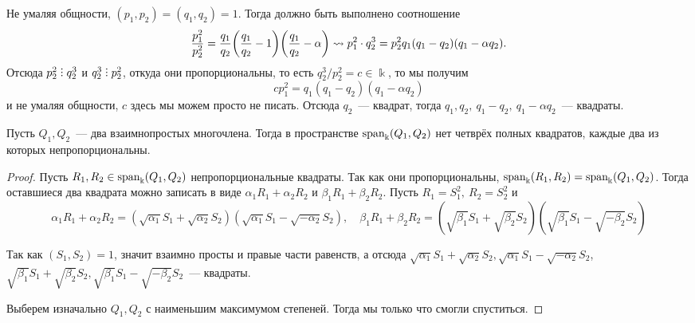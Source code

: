 	 Не умаляя общности, $(p_1, p_2) = (q_1, q_2) = 1$. Тогда должно быть выполнено соотношение 
	 \[
	 	\frac{p_1^2}{p_2^2} = \frac{q_1}{q_2}\lr*{\frac{q_1}{q_2} - 1}\lr*{\frac{q_1}{q_2} - \alpha} \rightsquigarrow p_1^2 \cdot q_2^3 = p_2^2 q_1(q_1 - q_2)(q_1 - \alpha q_2). 
	 \]
	 Отсюда $p_2^2 \divby q_2^3$  и $q_2^3 \divby p_2^2$, откуда они пропорциональны, то есть $q_2^3 / p_2^2 = c \in \Bbbk$, то мы получим 
	 \[
	 	c p_1^2 = q_1(q_1 - q_2)(q_1 - \alpha q_2)
	 \]
	 и не умаляя общности, $c$ здесь мы можем просто не писать. Отсюда $q_2$~--- квадрат, тогда $  q_1, q_2, \ q_1 - q_2, \ q_1 - \alpha q_2$~--- квадраты. 

	 \begin{statement} 
	 	Пусть $Q_1, Q_2$~--- два взаимнопростых многочлена. Тогда в пространстве $\operatorname{span}_{\Bbbk}(Q_1, Q_2)$ нет четврёх полных квадратов, каждые два из которых непропорциональны. 
	 \end{statement}
	 \begin{proof}
	 	Пусть $R_1, R_2 \in \operatorname{span}_{\Bbbk}(Q_1, Q_2)$ непропорциональные квадраты. Так как они пропорциональны, $\operatorname{span}_{\Bbbk}(R_1, R_2) = \operatorname{span}_{\Bbbk}(Q_1, Q_2)$. Тогда оставшиеся два квадрата можно записать в виде $\alpha_1 R_1 + \alpha_2 R_2$ и $\beta_1 R_1 + \beta_2 R_2$. Пусть $R_1 = S_1^2, \ R_2 = S_2^2$ и  
	 	\[
	 		\alpha_1 R_1 + \alpha_2 R_2 = (\sqrt{\alpha_1} S_1 + \sqrt{\alpha_2}S_2)(\sqrt{\alpha_1} S_1 - \sqrt{-\alpha_2}S_2), \quad \beta_1 R_1 + \beta_2 R_2 = (\sqrt{\beta_1} S_1 + \sqrt{\beta_2}S_2)(\sqrt{\beta_1} S_1 - \sqrt{-\beta_2}S_2)
	 	\]

	 	Так как $(S_1, S_2) = 1$, значит взаимно просты и правые части равенств, а отсюда $\sqrt{\alpha_1} S_1 + \sqrt{\alpha_2}S_2, \sqrt{\alpha_1} S_1 - \sqrt{-\alpha_2}S_2$, $\sqrt{\beta_1} S_1 + \sqrt{\beta_2}S_2, \sqrt{\beta_1} S_1 - \sqrt{-\beta_2}S_2$~--- квадраты. 

	 	Выберем изначально $Q_1, Q_2$ с наименьшим максимумом степеней. Тогда мы только что смогли спуститься. 
	 \end{proof}

